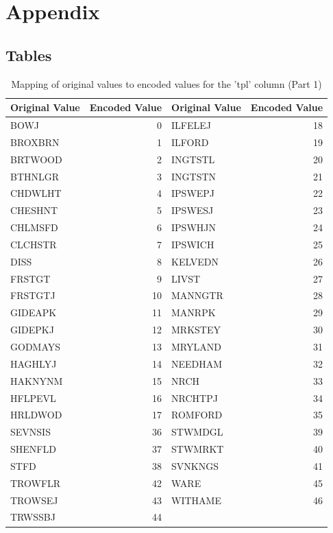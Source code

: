 \appendix
\section{Appendix}
\subsection{Tables}

\begin{table}[!htbp]
    \centering
    \begin{tabular}{|l|r||l|r|}
    \hline
    \textbf{Original Value} & \textbf{Encoded Value} & \textbf{Original Value} & \textbf{Encoded Value} \\
    \hline
    BOWJ & 0 & ILFELEJ & 18 \\
    BROXBRN & 1 & ILFORD & 19 \\
    BRTWOOD & 2 & INGTSTL & 20 \\
    BTHNLGR & 3 & INGTSTN & 21 \\
    CHDWLHT & 4 & IPSWEPJ & 22 \\
    CHESHNT & 5 & IPSWESJ & 23 \\
    CHLMSFD & 6 & IPSWHJN & 24 \\
    CLCHSTR & 7 & IPSWICH & 25 \\
    DISS & 8 & KELVEDN & 26 \\
    FRSTGT & 9 & LIVST & 27 \\
    FRSTGTJ & 10 & MANNGTR & 28 \\
    GIDEAPK & 11 & MANRPK & 29 \\
    GIDEPKJ & 12 & MRKSTEY & 30 \\
    GODMAYS & 13 & MRYLAND & 31 \\
    HAGHLYJ & 14 & NEEDHAM & 32 \\
    HAKNYNM & 15 & NRCH & 33 \\
    HFLPEVL & 16 & NRCHTPJ & 34 \\
    HRLDWOD & 17 & ROMFORD & 35 \\
    SEVNSIS & 36 & STWMDGL & 39 \\
    SHENFLD & 37 & STWMRKT & 40 \\
    STFD & 38 & SVNKNGS & 41 \\
    TROWFLR & 42 & WARE & 45 \\
    TROWSEJ & 43 & WITHAME & 46 \\
    TRWSSBJ & 44 &  &  \\
    \hline
    \end{tabular}
    \caption{Mapping of original values to encoded values for the 'tpl' column (Part 1)}
    \label{tab:tpl encoding}
\end{table}

